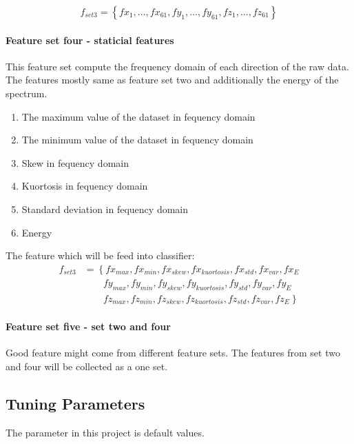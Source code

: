 \documentclass[USenglish]{ifimaster}  %
\begin{document}
\begin{equation} \label{eq:f2}
f_{set3}= \left\{ fx_1,\dotsc,fx_{61},fy_1, \dotsc,fy_{61},fz_1,\dotsc,fz_{61} \right\}
\end{equation}


\paragraph{Feature set four - staticial features} This feature set compute the frequency domain of each direction of the raw data. The features mostly same as feature set two and additionally the energy of the spectrum.

\begin{enumerate}
\item The maximum value of the dataset in fequency domain
\item The minimum value of the dataset in fequency domain
\item Skew in fequency domain
\item Kuortosis in fequency domain 
\item Standard deviation in fequency domain
\item Energy 
\end{enumerate}

The feature which will be feed into classifier:
\begin{align}
 f_{set3} &= \left\{ fx_{max},fx_{min},fx_{skew},fx_{kuortosis},fx_{std},fx_{var},fx_{E} \right.\nonumber\\
 &\qquad \left. {} fy_{max},fy_{min},fy_{skew},fy_{kuortosis},fy_{std},fy_{var},fy_{E} \right.\nonumber\\
 &\qquad \left. {} fz_{max},fz_{min},fz_{skew},fz_{kuortosis},fz_{std},fz_{var},fz_{E} \right\}
\end{align}

\paragraph{Feature set five - set two and four} Good feature might come from different feature sets. The features from set two and four will be collected as a one set. 

\subsection{Tuning Parameters}
The parameter in this project is default values. 
\end{document}
